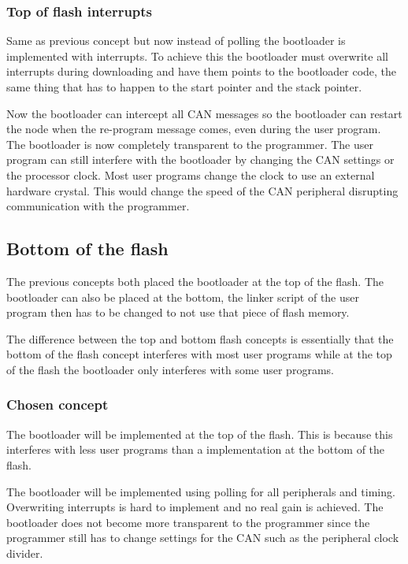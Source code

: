 \documentclass[twocolumn]{article}
\begin{document}
		\subsubsection*{Top of flash interrupts}
			Same as previous concept but now instead of polling the bootloader is implemented with interrupts.
			To achieve this the bootloader must overwrite all interrupts during downloading and have them points to the bootloader code,
			the same thing that has to happen to the start pointer and the stack pointer.
			
			Now the bootloader can intercept all CAN messages so the bootloader can restart the node when the re-program message comes,
			even during the user program.
			The bootloader is now completely transparent to the programmer.
			The user program can still interfere with the bootloader by changing the CAN settings or the processor clock.
			Most user programs change the clock to use an external hardware crystal.
			This would change the speed of the CAN peripheral disrupting communication with the programmer.
		
		\subsection*{Bottom of the flash}
			The previous concepts both placed the bootloader at the top of the flash.
			The bootloader can also be placed at the bottom,
			the linker script of the user program then has to be changed to not use that piece of flash memory.
			
			The difference between the top and bottom flash concepts is essentially that the bottom of the flash concept interferes with most user programs while at the top of the flash the bootloader only interferes with some user programs.
		
		\subsubsection*{Chosen concept}
			The bootloader will be implemented at the top of the flash.
			This is because this interferes with less user programs than a implementation at the bottom of the flash.
			
			The bootloader will be implemented using polling for all peripherals and timing.
			Overwriting interrupts is hard to implement and no real gain is achieved.
			The bootloader does not become more transparent to the programmer since the programmer still has to change settings for the CAN such as the peripheral clock divider.
			
\end{document}
